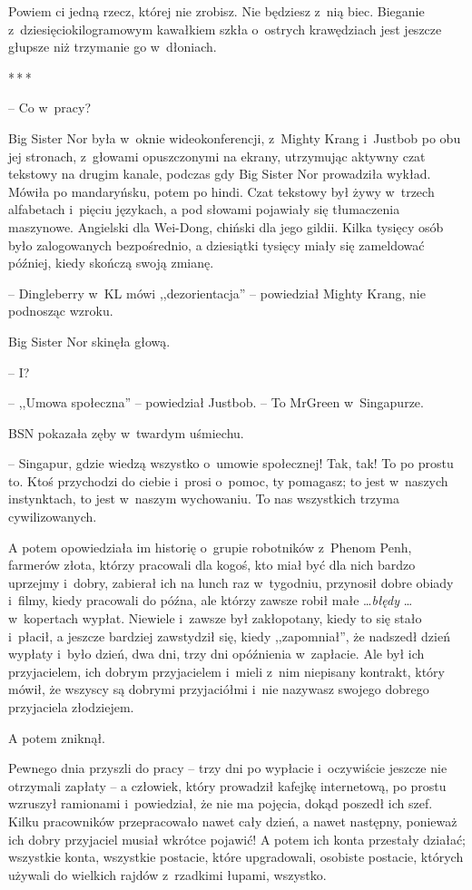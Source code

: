 \documentclass[oneside,polish,11pt,rmheadings]{mwbk}
\newcommand{\threeast}{\par\centerline{*\,*\,*}\medskip\par}
\begin{document}
Powiem ci jedną rzecz, której nie zrobisz. Nie będziesz z~nią biec. Bieganie z~dziesięciokilogramowym kawałkiem szkła o~ostrych krawędziach jest jeszcze głupsze niż trzymanie go w~dłoniach.

\bigskip
\threeast

-- Co w~pracy? 

 Big Sister Nor była w~oknie wideokonferencji, z~Mighty Krang i~Justbob po obu jej stronach, z~głowami opuszczonymi na ekrany, utrzymując aktywny czat tekstowy na drugim kanale, podczas gdy Big Sister Nor prowadziła wykład. Mówiła po mandaryńsku, potem po hindi. Czat tekstowy był żywy w~trzech alfabetach i~pięciu językach, a pod słowami pojawiały się tłumaczenia maszynowe. Angielski dla Wei-Dong, chiński dla jego gildii. Kilka tysięcy osób było zalogowanych bezpośrednio, a dziesiątki tysięcy miały się zameldować później, kiedy skończą swoją zmianę.

-- Dingleberry w~KL mówi ,,dezorientacja'' -- powiedział Mighty Krang, nie podnosząc wzroku.

Big Sister Nor skinęła głową. 

-- I? 

-- ,,Umowa społeczna'' -- powiedział Justbob. -- To MrGreen w~Singapurze.

BSN pokazała zęby w~twardym uśmiechu. 

-- Singapur, gdzie wiedzą wszystko o~umowie społecznej! Tak, tak! To po prostu to. Ktoś przychodzi do ciebie i~prosi o~pomoc, ty pomagasz; to jest w~naszych instynktach, to jest w~naszym wychowaniu. To nas wszystkich trzyma cywilizowanych.

A potem opowiedziała im historię o~grupie robotników z~Phenom Penh, farmerów złota, którzy pracowali dla kogoś, kto miał być dla nich bardzo uprzejmy i~dobry, zabierał ich na lunch raz w~tygodniu, przynosił dobre obiady i~filmy, kiedy pracowali do późna, ale którzy zawsze robił małe \ldots  \textit{błędy} \ldots  w~kopertach wypłat. Niewiele i~zawsze był zakłopotany, kiedy to się stało i~płacił, a jeszcze bardziej zawstydził się, kiedy ,,zapomniał'', że nadszedł dzień wypłaty i~było dzień, dwa dni, trzy dni opóźnienia w~zapłacie. Ale był ich przyjacielem, ich dobrym przyjacielem i~mieli z~nim niepisany kontrakt, który mówił, że wszyscy są dobrymi przyjaciółmi i~nie nazywasz swojego dobrego przyjaciela złodziejem.

A potem zniknął.

Pewnego dnia przyszli do pracy -- trzy dni po wypłacie i~oczywiście jeszcze nie otrzymali zapłaty -- a człowiek, który prowadził kafejkę internetową, po prostu wzruszył ramionami i~powiedział, że nie ma pojęcia, dokąd poszedł ich szef. Kilku pracowników przepracowało nawet cały dzień, a nawet następny, ponieważ ich dobry przyjaciel musiał wkrótce pojawić! A potem ich konta przestały działać; wszystkie konta, wszystkie postacie, które upgradowali, osobiste postacie, których używali do wielkich rajdów z~rzadkimi łupami, wszystko.
\end{document}
